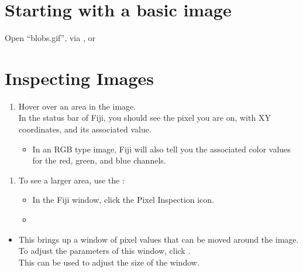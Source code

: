 \documentclass[letterpaper,10pt,english]{jupyterBook}
\begin{document}
\section{Starting with a basic image}
\label{\detokenize{basics:starting-with-a-basic-image}}
\sphinxAtStartPar
Open “blobs.gif”, via , or 


\section{Inspecting Images}
\label{\detokenize{basics:inspecting-images}}\begin{enumerate}
%
\item {} 
\sphinxAtStartPar
Hover over an area in the image.\\
In the status bar of Fiji, you should see the pixel you are on, with XY coordinates, and its associated value.
\begin{itemize}
\item {} 
\sphinxAtStartPar
In an RGB type image, Fiji will also tell you the associated color values for the
red, green, and blue channels.

\end{itemize}

\end{enumerate}

\sphinxAtStartPar
{}
\begin{enumerate}
%
\setcounter{enumi}{1}
\item {} 
\sphinxAtStartPar
To see a larger area, use the :
\begin{itemize}
\item {} 
\sphinxAtStartPar
In the Fiji window, click the Pixel Inspection icon.

\item {} 
\sphinxAtStartPar
{}

\end{itemize}

\end{enumerate}

\sphinxAtStartPar
{}
\begin{itemize}
\item {} 
\sphinxAtStartPar
This brings up a window of pixel values that can be moved around the image.\\
To adjust the parameters of this window, click .\\
This can be used to adjust the size of the window.

\end{itemize}
\end{document}
